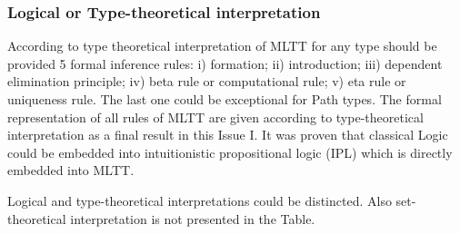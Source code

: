 \documentclass[twocolumn,10pt]{article}
\theoremstyle{definition}
\begin{document}
\subsubsection{Logical or Type-theoretical interpretation}

According to type theoretical interpretation of MLTT for any type should be provided 5 formal
inference rules: i) formation; ii) introduction; iii) dependent elimination principle;
iv) beta rule or computational rule; v) eta rule or uniqueness rule. The last one could
be exceptional for Path types. The formal representation of all rules of MLTT
are given according to type-theoretical interpretation as a final result in this Issue I.
It was proven that classical Logic could be embedded into
intuitionistic propositional logic (IPL) which is directly embedded into MLTT.

Logical and type-theoretical interpretations could be distincted. Also
set-theoretical interpretation is not presented in the Table.
\end{document}
